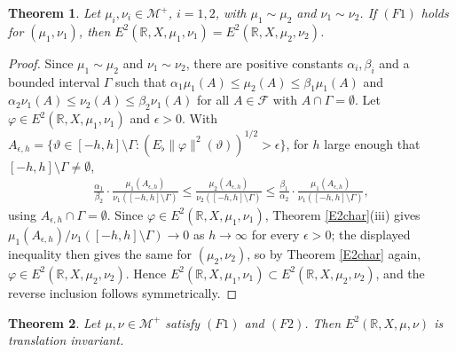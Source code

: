 \documentclass[11pt]{amsart}
\newtheorem{theorem}{Theorem}[section]
\begin{document}
\begin{theorem}\label{E2measeq}
Let $\mu_i,\nu_i\in\mathcal M^+$, $i=1,2$, with $\mu_1\sim\mu_2$ and $\nu_1\sim\nu_2$. If $(F1)$ holds for $(\mu_1,\nu_1)$, then $E^2(\mathbb R,X,\mu_1,\nu_1)=E^2(\mathbb R,X,\mu_2,\nu_2)$.
\end{theorem}

\begin{proof}
Since $\mu_1\sim\mu_2$ and $\nu_1\sim\nu_2$, there are positive constants $\alpha_i,\beta_i$ and a bounded interval $\Gamma$ such that $\alpha_1\mu_1(A)\le\mu_2(A)\le\beta_1\mu_1(A)$ and $\alpha_2\nu_1(A)\le\nu_2(A)\le\beta_2\nu_1(A)$ for all $A\in\mathcal F$ with $A\cap\Gamma=\emptyset$. Let $\varphi\in E^2(\mathbb R,X,\mu_1,\nu_1)$ and $\epsilon>0$. With $A_{\epsilon,h}=\{\vartheta\in[-h,h]\setminus\Gamma:(E_\flat\|\varphi\|^2(\vartheta))^{1/2}>\epsilon\}$, for $h$ large enough that $[-h,h]\setminus\Gamma\ne\emptyset$,
\begin{align*}
\frac{\alpha_1}{\beta_2}\cdot\frac{\mu_1(A_{\epsilon,h})}{\nu_1([-h,h]\setminus\Gamma)}\le\frac{\mu_2(A_{\epsilon,h})}{\nu_2([-h,h]\setminus\Gamma)}\le\frac{\beta_1}{\alpha_2}\cdot\frac{\mu_1(A_{\epsilon,h})}{\nu_1([-h,h]\setminus\Gamma)},
\end{align*}
using $A_{\epsilon,h}\cap\Gamma=\emptyset$. Since $\varphi\in E^2(\mathbb R,X,\mu_1,\nu_1)$, Theorem \ref{E2char}(iii) gives $\mu_1(A_{\epsilon,h})/\nu_1([-h,h]\setminus\Gamma)\to0$ as $h\to\infty$ for every $\epsilon>0$; the displayed inequality then gives the same for $(\mu_2,\nu_2)$, so by Theorem \ref{E2char} again, $\varphi\in E^2(\mathbb R,X,\mu_2,\nu_2)$. Hence $E^2(\mathbb R,X,\mu_1,\nu_1)\subset E^2(\mathbb R,X,\mu_2,\nu_2)$, and the reverse inclusion follows symmetrically.
\end{proof}

\begin{theorem}
Let $\mu,\nu\in\mathcal M^+$ satisfy $(F1)$ and $(F2)$. Then $E^2(\mathbb R,X,\mu,\nu)$ is translation invariant.
\end{theorem}
\end{document}
